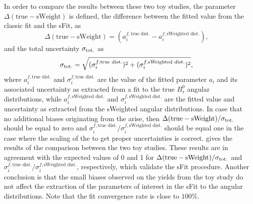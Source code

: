 In order to compare the results between these two toy studies, the parameter $\Delta(\textrm{true} - \textrm{sWeight})$ is defined, the difference between the fitted value from the classic fit and the sFit, as 
\begin{equation}
\Delta(\textrm{true} - \textrm{sWeight}) = (a_i^{f,\textrm{true dist.}} - a_i^{f,\textrm{sWeighted dist.}}), \,
\end{equation}
and the total uncertainty $\sigma_{\rm tot.}$ as
\begin{equation}
\sigma_{\rm tot.} = \sqrt{(\sigma_i^{f,\textrm{true dist.}})^2 + (\sigma_i^{f,\textrm{sWeighted dist.}})^2 },\,
\end{equation}
where $a_i^{f,\textrm{true dist.}}$ and $\sigma_i^{f,\textrm{true dist.}}$ are the value of the fitted parameter $a_i$ and its associated uncertainty as extracted from a fit to the true $B^0_s$ angular distributions, while $a_i^{f,\textrm{sWeighted dist.}}$ and $\sigma_i^{f,\textrm{sWeighted dist.}}$ are the fitted value and uncertainty as extracted from the sWeighted angular distributions. In case that no additional biases originating from the \sweights arise, then $\Delta(\textrm{true} - \textrm{sWeight}) / \sigma_{\rm tot.}$ should be equal to zero and $\sigma_i^{f,\textrm{true dist.}} / \sigma_i^{f,\textrm{sWeighted dist.}}$ should be equal one in the case where the scaling of the \sweights to get proper uncertainties is correct.  gives the results of the comparison between the two toy studies. These results are in agreement with the expected values of 0 and 1 for $\Delta(\textrm{true} - \textrm{sWeight}) / \sigma_{\rm tot.}$ and $\sigma_i^{f,\textrm{true dist.}} / \sigma_i^{f,\textrm{sWeighted dist.}}$, respectively, which validate the sFit procedure. Another conclusion is that the small biases observed on the \Bs yields from the toy study do not affect the extraction of the parameters of interest in the sFit to the angular distributions. Note that the fit convergence rate is close to $100\%$. 
%
